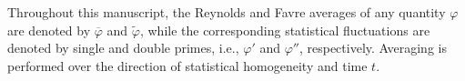 \documentclass[conf]{new-aiaa}
\begin{document}
Throughout this manuscript, the Reynolds and Favre averages of any quantity $\varphi$ are denoted by $\overline{\varphi}$ and $\widetilde{\varphi}$, while the corresponding statistical fluctuations are denoted by single and double primes, i.e., $\varphi'$ and $\varphi''$,  respectively. Averaging is performed over {the direction of statistical homogeneity and time $t$}. 


\end{document}
